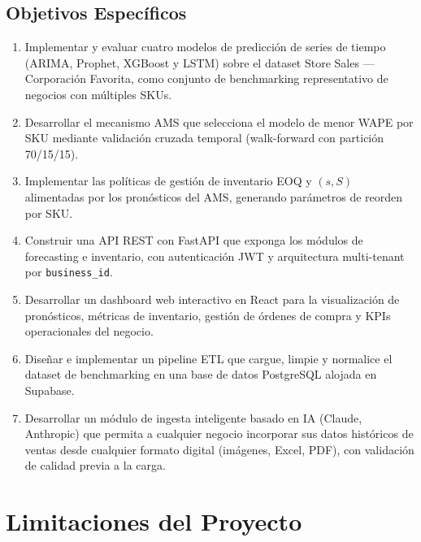 \documentclass[12pt, a4paper]{report}
\begin{document}
\subsection{Objetivos Específicos}

\begin{enumerate}
  \item Implementar y evaluar cuatro modelos de predicción de series de tiempo (ARIMA,
        Prophet, XGBoost y LSTM) sobre el dataset Store Sales — Corporación Favorita,
        como conjunto de benchmarking representativo de negocios con múltiples SKUs.
  \item Desarrollar el mecanismo AMS que selecciona el modelo de menor WAPE por SKU
        mediante validación cruzada temporal (walk-forward con partición 70/15/15).
  \item Implementar las políticas de gestión de inventario EOQ y $(s,S)$ alimentadas
        por los pronósticos del AMS, generando parámetros de reorden por SKU.
  \item Construir una API REST con FastAPI que exponga los módulos de forecasting e
        inventario, con autenticación JWT y arquitectura multi-tenant por
        \texttt{business\_id}.
  \item Desarrollar un dashboard web interactivo en React para la visualización de
        pronósticos, métricas de inventario, gestión de órdenes de compra y KPIs
        operacionales del negocio.
  \item Diseñar e implementar un pipeline ETL que cargue, limpie y normalice el dataset
        de benchmarking en una base de datos PostgreSQL alojada en Supabase.
  \item Desarrollar un módulo de ingesta inteligente basado en IA (Claude, Anthropic) que
        permita a cualquier negocio incorporar sus datos históricos de ventas desde
        cualquier formato digital (imágenes, Excel, PDF), con validación de calidad
        previa a la carga.
\end{enumerate}

\section{Limitaciones del Proyecto}
\end{document}
